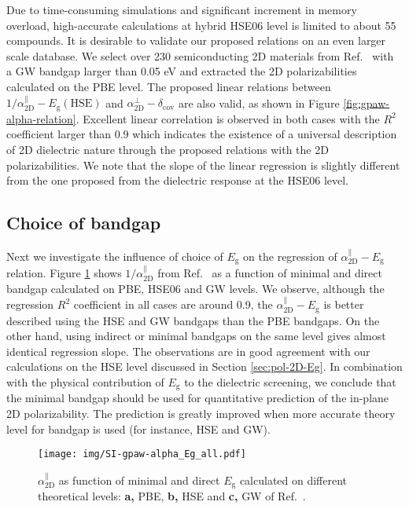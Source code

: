 \documentclass[manuscript=suppinfo,email=true,hyperref=true,keywords=false]{achemso}
\begin{document}
Due to time-consuming simulations and significant increment in 
memory overload, high-accurate calculations at hybrid HSE06 level is limited 
to about 55 compounds. 
It is desirable to validate our proposed
relations on an even larger scale database. We select over 230
semiconducting 2D materials from Ref.~ 
with a GW bandgap
larger than 0.05 eV and extracted the 2D polarizabilities calculated
on the PBE level. The proposed linear relations between
$1/\alpha_{\mathrm{2D}}^{\parallel}-E_{\mathrm{g}}(\mathrm{HSE})$ and
$\alpha_{\mathrm{2D}}^{\perp}-\delta_{\mathrm{cov}}$ are also valid,
as shown in Figure \ref{fig:gpaw-alpha-relation}. Excellent linear
correlation is observed in both cases with the $R^{2}$ coefficient
larger than 0.9 which indicates the existence of a universal description 
of 2D dielectric nature through the proposed relations with the 2D
polarizabilities. We note that the slope of the linear regression is
slightly different from the one proposed from the dielectric
response at the HSE06 level. 

\subsection{Choice of bandgap}
\label{sec:gpaw-2}

Next we investigate the influence of choice of $E_{\mathrm{g}}$ on the
regression of $\alpha_{\mathrm{2D}}^{\parallel}-E_{\mathrm{g}}$ relation. Figure
\ref{fig:SI-gpaw-alpha-Eg-all} shows $1/\alpha_{\mathrm{2D}}^{\parallel}$ from 
Ref.~ as a function of minimal and direct bandgap calculated
on PBE, HSE06 and GW levels. We observe,
although the regression $R^{2}$ coefficient in all cases are around
0.9, the $\alpha_{\mathrm{2D}}^{\parallel}-E_{\mathrm{g}}$ is better described using
the HSE and GW bandgaps than the PBE bandgaps. On the other hand,
using indirect or minimal bandgaps on the same level gives almost
identical regression slope. The observations are in good agreement
with our calculations on the HSE level discussed in Section
\ref{sec:pol-2D-Eg}. In combination with the physical contribution of
$E_{\mathrm{g}}$ to the dielectric screening, we conclude that the
minimal bandgap should be used for quantitative prediction of the
in-plane 2D polarizability. The prediction is greatly improved when
more accurate theory level for bandgap is used (for instance, HSE and GW).

\begin{figure}[htbp]
  \centering
  \texttt{[image: img/SI-gpaw-alpha\_Eg\_all.pdf]}
  \caption{$\alpha_{\mathrm{2D}}^{\parallel}$ as function of minimal and direct
    $E_{\mathrm{g}}$ calculated on different theoretical levels:
    \textbf{a,} PBE, \textbf{b,} HSE and \textbf{c,} GW of Ref.~.}
  \label{fig:SI-gpaw-alpha-Eg-all}
\end{figure}
\end{document}
